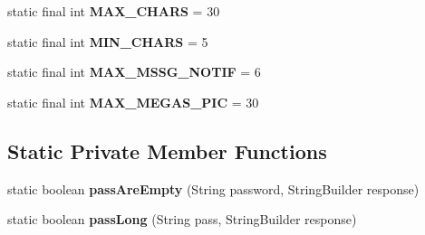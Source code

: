 \begin{DoxyCompactItemize}
\item 
static final int {\bfseries M\+A\+X\+\_\+\+C\+H\+A\+RS} = 30\hypertarget{classcom_1_1example_1_1sebastian_1_1tindertp_1_1commonTools_1_1Common_a33e2e3466136affefb31e64904d2885e}{}\label{classcom_1_1example_1_1sebastian_1_1tindertp_1_1commonTools_1_1Common_a33e2e3466136affefb31e64904d2885e}

\item 
static final int {\bfseries M\+I\+N\+\_\+\+C\+H\+A\+RS} = 5\hypertarget{classcom_1_1example_1_1sebastian_1_1tindertp_1_1commonTools_1_1Common_a56ede645d88610afb984ef92a595dc07}{}\label{classcom_1_1example_1_1sebastian_1_1tindertp_1_1commonTools_1_1Common_a56ede645d88610afb984ef92a595dc07}

\item 
static final int {\bfseries M\+A\+X\+\_\+\+M\+S\+S\+G\+\_\+\+N\+O\+T\+IF} = 6\hypertarget{classcom_1_1example_1_1sebastian_1_1tindertp_1_1commonTools_1_1Common_a6ce4f54e49fdc36622c4ba2ce24c9e3c}{}\label{classcom_1_1example_1_1sebastian_1_1tindertp_1_1commonTools_1_1Common_a6ce4f54e49fdc36622c4ba2ce24c9e3c}

\item 
static final int {\bfseries M\+A\+X\+\_\+\+M\+E\+G\+A\+S\+\_\+\+P\+IC} = 30\hypertarget{classcom_1_1example_1_1sebastian_1_1tindertp_1_1commonTools_1_1Common_ad3c210687394f5705170772645cda6a6}{}\label{classcom_1_1example_1_1sebastian_1_1tindertp_1_1commonTools_1_1Common_ad3c210687394f5705170772645cda6a6}

\end{DoxyCompactItemize}
\subsection*{Static Private Member Functions}
\begin{DoxyCompactItemize}
\item 
static boolean {\bfseries pass\+Are\+Empty} (String password, String\+Builder response)\hypertarget{classcom_1_1example_1_1sebastian_1_1tindertp_1_1commonTools_1_1Common_a824d7411383e3fa2a7c3d9754ee0e950}{}\label{classcom_1_1example_1_1sebastian_1_1tindertp_1_1commonTools_1_1Common_a824d7411383e3fa2a7c3d9754ee0e950}

\item 
static boolean {\bfseries pass\+Long} (String pass, String\+Builder response)\hypertarget{classcom_1_1example_1_1sebastian_1_1tindertp_1_1commonTools_1_1Common_a5e66efe07443c8aadee9736fb637602a}{}\label{classcom_1_1example_1_1sebastian_1_1tindertp_1_1commonTools_1_1Common_a5e66efe07443c8aadee9736fb637602a}

\end{DoxyCompactItemize}
